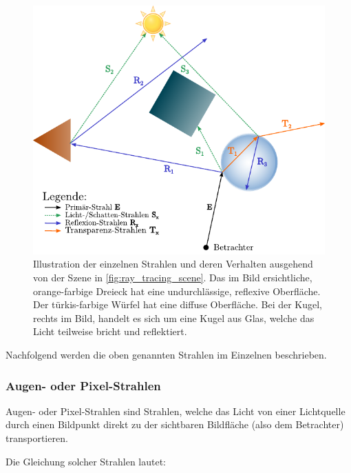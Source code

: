 \begin{figure}[H]\label{fig:ray_tracing_scene_rays}
    \centering
    \includegraphics{img/ray_tracing_scene_rays.pdf}
    \caption{Illustration der einzelnen Strahlen und deren Verhalten
        ausgehend von der Szene in
        \autoref{fig:ray_tracing_scene}.\protect\footnotemark{} Das im
        Bild ersichtliche, orange-farbige Dreieck hat eine
        undurchlässige, reflexive Oberfläche. Der türkis-farbige Würfel
        hat eine diffuse Oberfläche.  Bei der Kugel, rechts im Bild,
        handelt es sich um eine Kugel aus Glas, welche das Licht
        teilweise bricht und reflektiert.}
\end{figure}


Nachfolgend werden die oben genannten Strahlen im Einzelnen beschrieben.

\subsubsection{Augen- oder Pixel-Strahlen}
\label{ssubsec:ray_tracing:eye_rays}

Augen- oder Pixel-Strahlen sind Strahlen, welche das Licht von einer
Lichtquelle durch einen Bildpunkt direkt zu der sichtbaren Bildfläche
(also dem Betrachter) transportieren.

Die Gleichung solcher Strahlen lautet:

